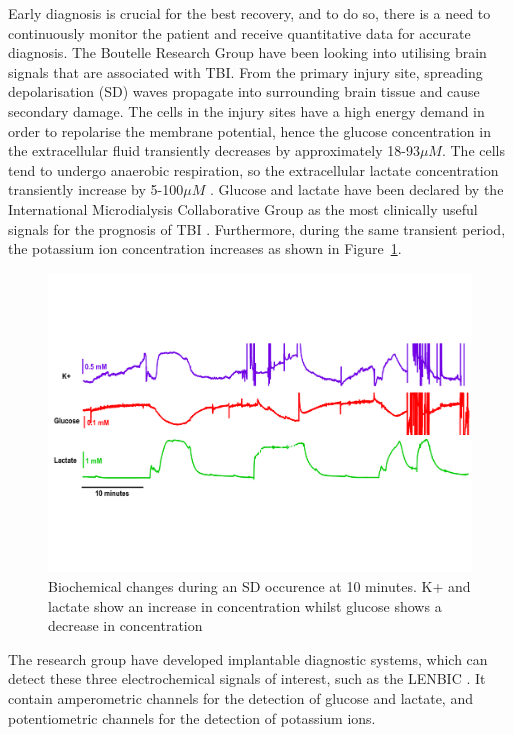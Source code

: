 Early diagnosis is crucial for the best recovery, and to do so, there is a need to continuously monitor the patient and receive quantitative data for accurate diagnosis. The Boutelle Research Group have been looking into utilising brain signals that are associated with TBI. From the primary injury site, spreading depolarisation (SD) waves propagate into surrounding brain tissue and cause secondary damage. The cells in the injury sites have a high energy demand in order to repolarise the membrane potential, hence the glucose concentration in the extracellular fluid transiently decreases by approximately 18-93$\mu M$. The cells tend to undergo anaerobic respiration, so the extracellular lactate concentration transiently increase by 5-100$\mu M$ \cite{D.2010}. Glucose and lactate have been declared by the International Microdialysis Collaborative Group as the most clinically useful signals for the prognosis of TBI \cite{Hutchinson2015}. Furthermore, during the same transient period, the potassium ion concentration increases \cite{Rogers2017} as shown in Figure~\ref{fig: SD}.

\begin{figure}[t]
\centering
\includegraphics[trim={0cm 5cm 0.5cm  5cm}, clip, width=1\textwidth]{./figures/conc.pdf}
\captionsetup{justification=centering}
\caption{Biochemical changes during an SD occurence at 10 minutes. K+ and lactate show an increase in concentration whilst glucose shows a decrease in concentration \cite{Rogers2017}}
\label{fig: SD}
\end{figure}

The research group have developed implantable diagnostic systems, which can detect these three electrochemical signals of interest, such as the LENBIC \cite{Pagkalos2017}. It contain amperometric channels for the detection of glucose and lactate, and potentiometric channels for the detection of potassium ions.

